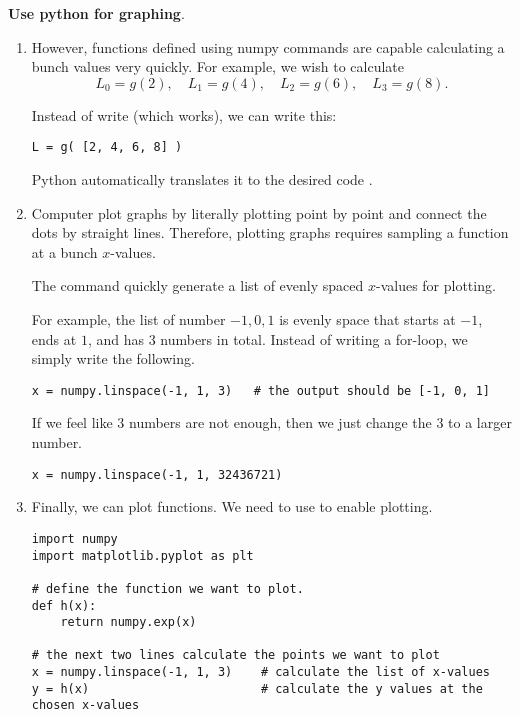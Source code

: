 \documentclass[../main.tex]{subfiles}
\begin{document}
\textbf{Use python for graphing}.  

\begin{enumerate}
  \item However, functions defined using numpy commands are capable calculating a bunch values very quickly.  For example, we wish to calculate
    \[
      L_{0} = g(2), \quad L_{1} = g(4), \quad L_{2} = g(6), \quad L_{3} = g(8).
    \]

    Instead of write  (which works), we can write this:
    \begin{verbatim}
L = g( [2, 4, 6, 8] )
    \end{verbatim}
    Python automatically translates it to the desired code .

  \item Computer plot graphs by literally plotting point by point and connect the dots by straight lines.  Therefore, plotting graphs requires sampling a function at a bunch \(x\)-values. 

    The command  quickly generate a list of evenly spaced \(x\)-values for plotting.

    For example, the list of number \(-1, 0, 1\) is evenly space that starts at \(-1\), ends at \(1\), and has \(3\) numbers in total.  Instead of writing a for-loop, we simply write the following.
    \begin{verbatim}
x = numpy.linspace(-1, 1, 3)   # the output should be [-1, 0, 1]
    \end{verbatim}
    
    If we feel like \(3\) numbers are not enough, then we just change the \(3\) to a larger number.
    \begin{verbatim}
x = numpy.linspace(-1, 1, 32436721)
    \end{verbatim}

  \item Finally, we can plot functions.   We need to use  to enable plotting. 

    \begin{verbatim}
import numpy
import matplotlib.pyplot as plt

# define the function we want to plot.
def h(x):
    return numpy.exp(x)

# the next two lines calculate the points we want to plot
x = numpy.linspace(-1, 1, 3)    # calculate the list of x-values
y = h(x)                        # calculate the y values at the chosen x-values


\end{verbatim}
\end{enumerate}
\end{document}
